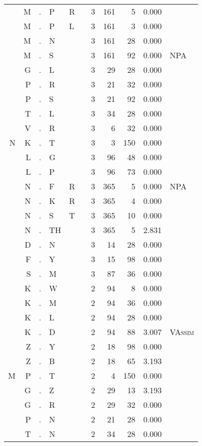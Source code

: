 \begin{longtable}{r@{ } r@{ } c@{ } l@{ } l@{ } l@{ } r r r r l }
 & M & . & P & R &  & 3 & 161 & 5 & 0.000 &  \\
 & M & . & P & L &  & 3 & 161 & 3 & 0.000 &  \\
 & M & . & N &  &  & 3 & 161 & 28 & 0.000 &  \\
 & M & . & S &  &  & 3 & 161 & 92 & 0.000 & \textsc{NPA} \\
 & G & . & L &  &  & 3 & 29 & 28 & 0.000 &  \\
 & P & . & R &  &  & 3 & 21 & 32 & 0.000 &  \\
 & P & . & S &  &  & 3 & 21 & 92 & 0.000 &  \\
 & T & . & L &  &  & 3 & 34 & 28 & 0.000 &  \\
 & V & . & R &  &  & 3 & 6 & 32 & 0.000 &  \\
N & K & . & T &  &  & 3 & 3 & 150 & 0.000 &  \\
 & L & . & G &  &  & 3 & 96 & 48 & 0.000 &  \\
 & L & . & P &  &  & 3 & 96 & 73 & 0.000 &  \\
 & N & . & F & R &  & 3 & 365 & 5 & 0.000 & \textsc{NPA} \\
 & N & . & K & R &  & 3 & 365 & 4 & 0.000 &  \\
 & N & . & S & T &  & 3 & 365 & 10 & 0.000 &  \\
 & N & . & TH &  &  & 3 & 365 & 5 & 2.831 &  \\
 & D & . & N &  &  & 3 & 14 & 28 & 0.000 &  \\
 & F & . & Y &  &  & 3 & 15 & 98 & 0.000 &  \\
 & S & . & M &  &  & 3 & 87 & 36 & 0.000 &  \\
 & K & . & W &  &  & 2 & 94 & 8 & 0.000 &  \\
 & K & . & M &  &  & 2 & 94 & 36 & 0.000 &  \\
 & K & . & L &  &  & 2 & 94 & 28 & 0.000 &  \\
 & K & . & D &  &  & 2 & 94 & 88 & 3.007 & \textsc{VAssim} \\
 & Z & . & Y &  &  & 2 & 18 & 98 & 0.000 &  \\
 & Z & . & B &  &  & 2 & 18 & 65 & 3.193 &  \\
M & P & . & T &  &  & 2 & 4 & 150 & 0.000 &  \\
 & G & . & Z &  &  & 2 & 29 & 13 & 3.193 &  \\
 & G & . & R &  &  & 2 & 29 & 32 & 0.000 &  \\
 & P & . & N &  &  & 2 & 21 & 28 & 0.000 &  \\
 & T & . & N &  &  & 2 & 34 & 28 & 0.000 &  \\

\end{longtable}
